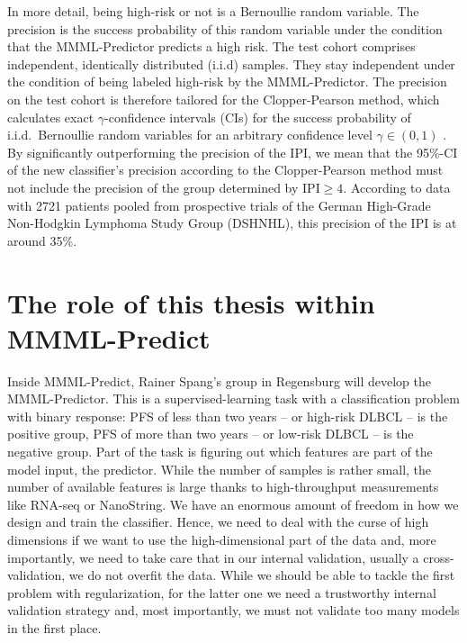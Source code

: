 In more detail, being high-risk or not is a Bernoullie random variable. 
The precision is the success probability of this random variable under the condition that the 
MMML-Predictor predicts a high risk. The test cohort comprises independent, identically distributed 
(i.i.d) samples. They stay independent under the condition of being labeled high-risk by the 
MMML-Predictor. The precision on the test cohort is therefore tailored for the Clopper-Pearson 
method, which calculates exact $\gamma$-confidence intervals (CIs) for the success probability 
of i.i.d.\ Bernoullie random variables for an arbitrary confidence level $\gamma \in (0, 1)$
\cite{clopper34}.
By significantly outperforming the precision of the IPI, we mean that the \num{95}\%-CI
of the new classifier's precision according to the Clopper-Pearson method must not include the 
precision of the group determined by $\text{IPI} \geq 4$. According to data with \num{2721} 
patients pooled from prospective trials of the German High-Grade Non-Hodgkin Lymphoma Study Group 
(DSHNHL), this precision of the IPI is at around \num{35}\%. 

\section{The role of this thesis within MMML-Predict}

Inside MMML-Predict, Rainer Spang's group in Regensburg will develop the MMML-Predictor. 
This is 
a supervised-learning task with a classification problem with binary response: PFS of less 
than two years -- or high-risk DLBCL -- is the positive group, PFS of more than two 
years -- or low-risk DLBCL -- is the negative group. Part of the task is figuring out which features
are part of the model input, the predictor.
While the number of samples is rather small, 
the number of available features is large thanks to high-throughput measurements like RNA-seq or 
NanoString. We have an enormous amount of freedom in how we design and train the classifier. 
Hence, we need to deal with the curse of high dimensions if we want to use the high-dimensional part 
of the data and, 
more importantly, we need to take care that in our internal validation, usually a cross-validation,
we do not overfit the data. While we should be able to tackle the first problem with regularization,
for the latter one we need a trustworthy internal validation strategy and, most importantly, we 
must not validate too many models in the first place.

